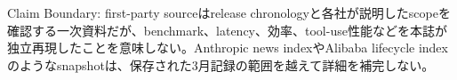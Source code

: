 \begin{claimboundary}
Claim Boundary: first-party sourceはrelease chronologyと各社が説明したscopeを確認する一次資料だが、benchmark、latency、効率、tool-use性能などを本誌が独立再現したことを意味しない。Anthropic news indexやAlibaba lifecycle indexのようなsnapshotは、保存された3月記録の範囲を越えて詳細を補完しない。\autocite{src-46b3e364b737,src-8afdb503cc56,src-9156c37fb1c2,src-a24fd97eb3d0,src-eac8dfbeb78c,src-eea6230f612a,src-f6aa679babd7}
\end{claimboundary}
